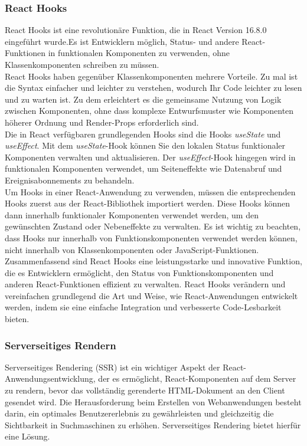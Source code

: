 \subsubsection{React Hooks}
React Hooks ist eine revolutionäre Funktion, die in React Version 16.8.0 eingeführt wurde.Es ist  Entwicklern möglich, Status- und andere React-Funktionen in funktionalen Komponenten zu verwenden, ohne Klassenkomponenten schreiben zu müssen.\\
React Hooks haben gegenüber Klassenkomponenten mehrere Vorteile. Zu mal ist die Syntax einfacher und leichter  zu verstehen, wodurch Ihr Code leichter zu lesen und zu warten ist. Zu dem erleichtert es die gemeinsame Nutzung von Logik zwischen Komponenten, ohne dass komplexe Entwurfsmuster wie Komponenten höherer Ordnung und Render-Props erforderlich sind.\\
Die in React verfügbaren grundlegenden Hooks sind die Hooks \emph{useState} und \emph{useEffect}. Mit dem \emph{useState}-Hook können Sie den lokalen Status funktionaler Komponenten verwalten und  aktualisieren. Der \emph{useEffect}-Hook hingegen wird  in funktionalen Komponenten verwendet, um Seiteneffekte wie Datenabruf und Ereignisabonnements zu behandeln.\\  
Um Hooks in einer React-Anwendung zu verwenden, müssen   die entsprechenden Hooks zuerst aus der React-Bibliothek importiert werden. Diese Hooks können dann innerhalb funktionaler Komponenten verwendet werden, um den gewünschten Zustand oder Nebeneffekte zu verwalten. Es ist wichtig zu beachten, dass Hooks nur innerhalb von Funktionskomponenten verwendet werden können, nicht innerhalb von Klassenkomponenten oder JavaScript-Funktionen. \cite{react-hooks}\\
Zusammenfassend sind React Hooks eine leistungsstarke und innovative Funktion, die es Entwicklern ermöglicht, den Status von Funktionskomponenten und anderen React-Funktionen effizient zu verwalten.  React Hooks verändern und vereinfachen grundlegend die Art und Weise, wie React-Anwendungen entwickelt werden, indem sie eine einfache Integration und verbesserte Code-Lesbarkeit bieten.

\subsubsection{Serverseitiges Rendern}
Serverseitiges Rendering (SSR) ist ein wichtiger Aspekt der React-Anwendungsentwicklung, der es ermöglicht, React-Komponenten auf dem Server zu rendern, bevor das vollständig gerenderte HTML-Dokument an den Client gesendet wird.
Die Herausforderung beim Erstellen von Webanwendungen besteht darin, ein optimales Benutzererlebnis zu gewährleisten und gleichzeitig die Sichtbarkeit in Suchmaschinen zu erhöhen. Serverseitiges Rendering bietet hierfür eine Lösung.\\

